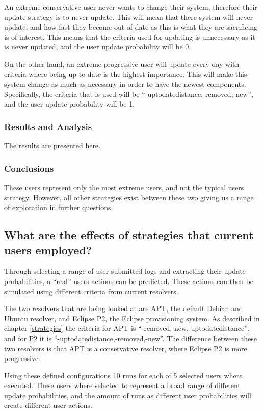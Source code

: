 An extreme conservative user never wants to change their system, therefore their update strategy is to never update.
This will mean that there system will never update, and how fast they become out of date as this is what they are sacrificing is of interest.
This means that the criteria used for updating is unnecessary as it is never updated, and the user update probability will be 0.

On the other hand, an extreme progressive user will update every day with criteria where being up to date is the highest importance.
This will make this system change as much as necessary in order to have the newest components.
Specifically, the criteria that is used will be ``-uptodatedistance,-removed,-new'', and the user update probability will be 1.

\subsubsection{Results and Analysis}
The results are presented here.

\subsubsection{Conclusions}
These users represent only the most extreme users, and not the typical users strategy.
However, all other strategies exist between these two giving us a range of exploration in further questions.

\subsection{What are the effects of strategies that current users employed?}
Through selecting a range of user submitted logs and extracting their update probabilities, a ``real'' users actions can be predicted.
These actions can then be simulated using different criteria from current resolvers.

The two resolvers that are being looked at are APT, the default Debian and Ubuntu resolver, and Eclipse P2, the Eclipse provisioning system.
As described in chapter \ref{strategies} the criteria for APT is ``-removed,-new,-uptodatedistance'', and for P2 it is ``-uptodatedistance,-removed,-new''.
The difference between these two resolvers is that APT is a conservative resolver, where Eclipse P2 is more progressive. 

Using these defined configurations 10 runs for each of 5 selected users where executed. 
These users where selected to represent a broad range of different update probabilities, and the amount of runs as different user probabilities will create different user actions.


